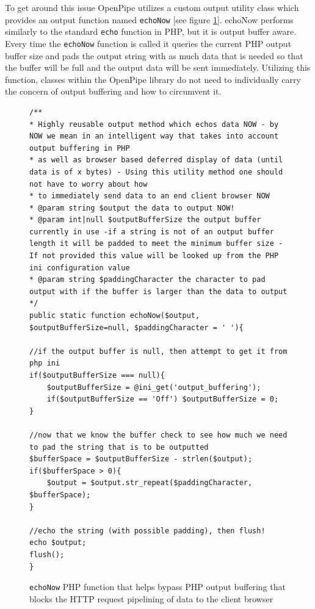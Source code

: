 \documentclass[12pt]{report}
\begin{document}
To get around this issue OpenPipe utilizes a custom output utility class which provides an output function named \texttt{echoNow} [see figure \ref{fig:echoNowCode}]. echoNow performs similarly to the standard \texttt{echo} function in PHP, but it is output buffer aware. Every time the \texttt{echoNow} function is called it queries the current PHP output buffer size and pads the output string with as much data that is needed so that the buffer will be full and the output data will be sent immediately. Utilizing this function, classes within the OpenPipe library do not need to individually carry the concern of output buffering and how to circumvent it.

\begin{figure}[H]
\begin{lstlisting}
/**
* Highly reusable output method which echos data NOW - by NOW we mean in an intelligent way that takes into account output buffering in PHP
* as well as browser based deferred display of data (until data is of x bytes) - Using this utility method one should not have to worry about how 
* to immediately send data to an end client browser NOW
* @param string $output the data to output NOW!
* @param int|null $outputBufferSize the output buffer currently in use -if a string is not of an output buffer length it will be padded to meet the minimum buffer size - If not provided this value will be looked up from the PHP ini configuration value 
* @param string $paddingCharacter the character to pad output with if the buffer is larger than the data to output
*/
public static function echoNow($output, $outputBufferSize=null, $paddingCharacter = ' '){

//if the output buffer is null, then attempt to get it from php ini
if($outputBufferSize === null){
	$outputBufferSize = @ini_get('output_buffering');
	if($outputBufferSize == 'Off') $outputBufferSize = 0;
}
		
//now that we know the buffer check to see how much we need to pad the string that is to be outputted
$bufferSpace = $outputBufferSize - strlen($output);
if($bufferSpace > 0){
	$output = $output.str_repeat($paddingCharacter, $bufferSpace);
}

//echo the string (with possible padding), then flush!
echo $output;
flush();
}
\end{lstlisting}
\caption{\texttt{echoNow} PHP function that helps bypass PHP output buffering that blocks the HTTP request pipelining of data to the client browser}
\label{fig:echoNowCode}
\end{figure}
\end{document}
